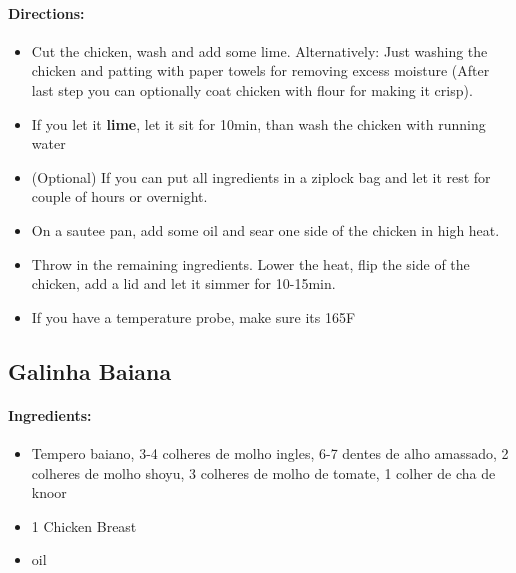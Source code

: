 \documentclass{article}
\begin{document}
\paragraph{Directions:}
\begin{itemize}
    \item Cut the chicken, wash and add some lime. Alternatively: Just washing the chicken and patting with paper towels for removing excess moisture (After last step you can optionally coat chicken with flour for making it crisp).
    \item If you let it \textbf{lime}, let it sit for 10min, than wash the chicken with running water
    \item (Optional) If you can put all ingredients in a ziplock bag and let it rest for couple of hours or overnight.
    \item On a sautee pan, add some oil and sear one side of the chicken in high heat.
    \item Throw in the remaining ingredients. Lower the heat, flip the side of the chicken, add a lid and let it simmer for 10-15min.
    \item If you have a temperature probe, make sure its 165F
\end{itemize}

\subsection{Galinha Baiana}

\paragraph{Ingredients:}
\begin{itemize}
    \item Tempero baiano, 3-4 colheres de molho ingles, 6-7 dentes de alho amassado, 2 colheres de molho shoyu, 3 colheres de molho de tomate, 1 colher de cha de knoor
    \item 1 Chicken Breast
    \item oil
\end{itemize}
\end{document}
